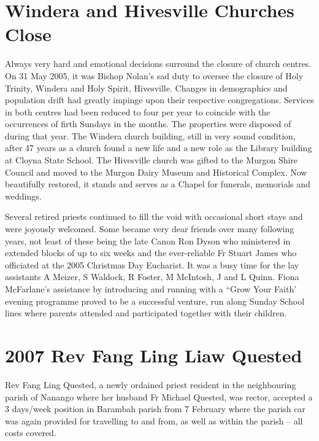 \hypertarget{windera-and-hivesville-churches-close}{%
\section{Windera and Hivesville Churches Close}\label{windera-and-hivesville-churches-close}}

Always very hard and emotional decisions surround the closure of church centres. On 31 May 2005, it was Bishop Nolan's sad duty to oversee the closure of Holy Trinity, Windera and Holy Spirit, Hivesville. Changes in demographics and population drift had greatly impinge upon their respective congregations. Services in both centres had been reduced to four per year to coincide with the occurrences of firth Sundays in the months. The properties were disposed of during that year. The Windera church building, still in very sound condition, after 47 years as a church found a new life and a new role as the Library building at Cloyna State School. The Hivesville church was gifted to the Murgon Shire Council and moved to the Murgon Dairy Museum and Historical Complex. Now beautifully restored, it stands and serves as a Chapel for funerals, memorials and weddings.

Several retired priests continued to fill the void with occasional short stays and were joyously welcomed. Some became very dear friends over many following years, not least of these being the late Canon Ron Dyson who ministered in extended blocks of up to six weeks and the ever-reliable Fr Stuart James who officiated at the 2005 Christmas Day Eucharist. It was a busy time for the lay assistants A Meizer, S Waldock, R Foster, M McIntosh, J and L Quinn. Fiona McFarlane's assistance by introducing and running with a ``Grow Your Faith' evening programme proved to be a successful venture, run along Sunday School lines where parents attended and participated together with their children.

\hypertarget{rev-fang-ling-liaw-quested}{%
\section{2007 Rev Fang Ling Liaw Quested}\label{rev-fang-ling-liaw-quested}}

Rev Fang Ling Quested, a newly ordained priest resident in the neighbouring parish of Nanango where her husband Fr Michael Quested, was rector, accepted a 3 days/week position in Barambah parish from 7 February where the parish car was again provided for travelling to and from, as well as within the parish -- all costs covered.

